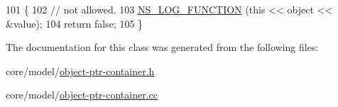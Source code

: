 \begin{DoxyCode}
101 \{
102   \textcolor{comment}{// not allowed.}
103   \hyperlink{log-macros-disabled_8h_a90b90d5bad1f39cb1b64923ea94c0761}{NS\_LOG\_FUNCTION} (\textcolor{keyword}{this} << \textcolor{keywordtype}{object} << &value);
104   \textcolor{keywordflow}{return} \textcolor{keyword}{false};
105 \}
\end{DoxyCode}


The documentation for this class was generated from the following files\+:\begin{DoxyCompactItemize}
\item 
core/model/\hyperlink{object-ptr-container_8h}{object-\/ptr-\/container.\+h}\item 
core/model/\hyperlink{object-ptr-container_8cc}{object-\/ptr-\/container.\+cc}\end{DoxyCompactItemize}

